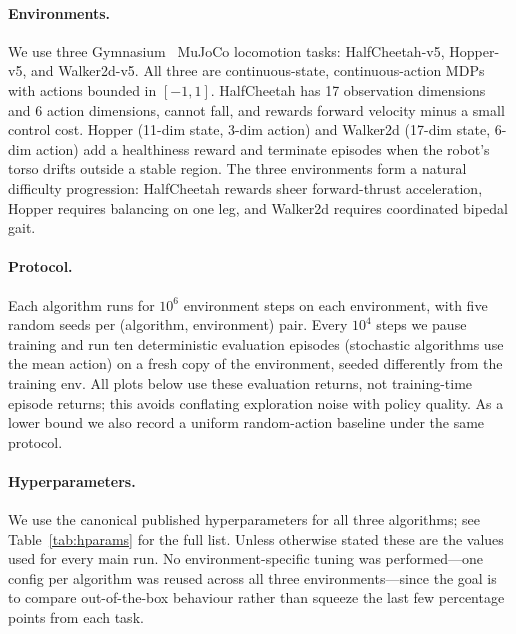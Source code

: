\documentclass[letterpaper]{article}
\begin{document}
\paragraph{Environments.}
We use three Gymnasium~\citep{towers2024gymnasium} MuJoCo
\citep{todorov2012mujoco,farama2024mujoco} locomotion tasks:
HalfCheetah-v5, Hopper-v5, and Walker2d-v5. All three are continuous-state,
continuous-action MDPs with actions bounded in $[-1,1]$. HalfCheetah has
17 observation dimensions and 6 action dimensions, cannot fall, and
rewards forward velocity minus a small control cost. Hopper (11-dim state,
3-dim action) and Walker2d (17-dim state, 6-dim action) add a healthiness
reward and terminate episodes when the robot's torso drifts outside a
stable region. The three environments form a natural difficulty
progression: HalfCheetah rewards sheer forward-thrust acceleration,
Hopper requires balancing on one leg, and Walker2d requires coordinated
bipedal gait.

\paragraph{Protocol.}
Each algorithm runs for $10^{6}$ environment steps on each environment,
with five random seeds per (algorithm, environment) pair. Every
$10^{4}$ steps we pause training and run ten deterministic evaluation
episodes (stochastic algorithms use the mean action) on a fresh copy of
the environment, seeded differently from the training env. All plots
below use these evaluation returns, not training-time episode returns;
this avoids conflating exploration noise with policy quality. As a lower
bound we also record a uniform random-action baseline under the same
protocol.

\paragraph{Hyperparameters.}
We use the canonical published hyperparameters for all three algorithms;
see Table~\ref{tab:hparams} for the full list.
Unless otherwise stated these are the values used for every main run. No
environment-specific tuning was performed---one config per algorithm was
reused across all three environments---since the goal is to compare
out-of-the-box behaviour rather than squeeze the last few percentage points
from each task.
\end{document}
